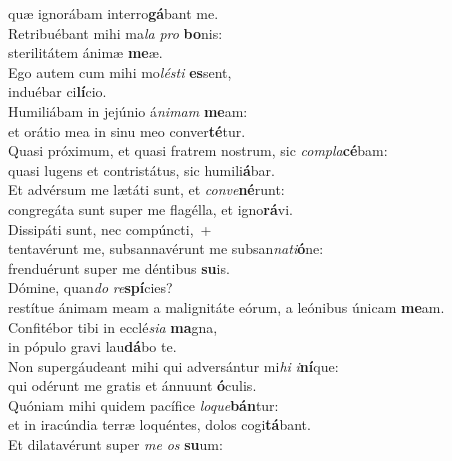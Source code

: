 \oddverse quæ ignorábam interro\textbf{gá}bant me.\\
\evenverse Retribuébant mihi ma\textit{la} \textit{pro} \textbf{bo}nis:~\*\\
\evenverse sterilitátem ánimæ \textbf{me}æ.\\
\oddverse Ego autem cum mihi mo\textit{lé}\textit{sti} \textbf{es}sent,~\*\\
\oddverse induébar ci\textbf{lí}cio.\\
\evenverse Humiliábam in jejúnio á\textit{ni}\textit{mam} \textbf{me}am:~\*\\
\evenverse et orátio mea in sinu meo conver\textbf{té}tur.\\
\oddverse Quasi próximum, et quasi fratrem nostrum, sic \textit{com}\textit{pla}\textbf{cé}bam:~\*\\
\oddverse quasi lugens et contristátus, sic humili\textbf{á}bar.\\
\evenverse Et advérsum me lætáti sunt, et \textit{con}\textit{ve}\textbf{né}runt:~\*\\
\evenverse congregáta sunt super me flagélla, et igno\textbf{rá}vi.\\
\oddverse Dissipáti sunt, nec compúncti,~+\\
\oddverse  tentavérunt me, subsannavérunt me subsan\textit{na}\textit{ti}\textbf{ó}ne:~\*\\
\oddverse frenduérunt super me déntibus \textbf{su}is.\\
\evenverse Dómine, quan\textit{do} \textit{re}\textbf{spí}cies?~\*\\
\evenverse restítue ánimam meam a malignitáte eórum, a leónibus únicam \textbf{me}am.\\
\oddverse Confitébor tibi in ecclé\textit{si}\textit{a} \textbf{ma}gna,~\*\\
\oddverse in pópulo gravi lau\textbf{dá}bo te.\\
\evenverse Non supergáudeant mihi qui adversántur mi\textit{hi} \textit{i}\textbf{ní}que:~\*\\
\evenverse qui odérunt me gratis et ánnuunt \textbf{ó}culis.\\
\oddverse Quóniam mihi quidem pacífice \textit{lo}\textit{que}\textbf{bán}tur:~\*\\
\oddverse et in iracúndia terræ loquéntes, dolos cogi\textbf{tá}bant.\\
\evenverse Et dilatavérunt super \textit{me} \textit{os} \textbf{su}um:~\*\\

